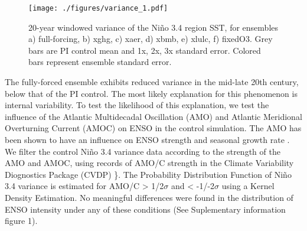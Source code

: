 \documentclass[12pt]{article}
\begin{document}
\begin{figure}[htbp]
\centering
\texttt{[image: ./figures/variance\_1.pdf]}
\caption{\label{fig:variance_1}20-year windowed variance of the Niño 3.4 region SST, for ensembles a) full-forcing, b) xghg, c) xaer, d) xbmb, e) xlulc, f) fixedO3. Grey bars are PI control mean and 1x, 2x, 3x standard error. Colored bars represent ensemble standard error.}
\end{figure}

The fully-forced ensemble exhibits reduced variance in the mid-late 20th century, below that of the PI control. The most likely explanation for this phenomenon is internal variability. To test the likelihood of this explanation, we test the influence of the Atlantic Multidecadal Oscillation (AMO) and Atlantic Meridional Overturning Current (AMOC) on ENSO in the control simulation. The AMO has been shown to have an influence on ENSO strength and seasonal growth rate \parencite{levine2017impact}. We filter the control Niño 3.4 variance data according to the strength of the AMO and AMOC, using records of AMO/C strength in the Climate Variability Diognostics Package (CVDP) \parencite{phillips2014evaluating}\}. The Probability Distribution Function of Niño 3.4 variance is estimated for AMO/C > 1/2\(\sigma\) and < -1/-2\(\sigma\) using a Kernel Density Estimation. No meaningful differences were found in the distribution of ENSO intensity under any of these conditions (See Suplementary information figure 1).
\end{document}
